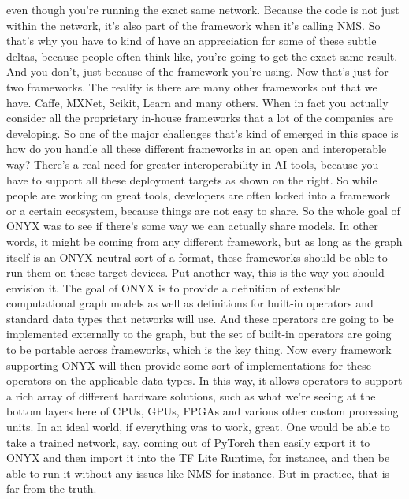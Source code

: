 {{{{{    even though you're running the exact same network.
    Because the code is not just within the network,
    it's also part of the framework when it's calling NMS.
    So that's why you have to kind of have an appreciation for some
    of these subtle deltas, because people often
    think like, you're going to get the exact same result.
    And you don't, just because of the framework you're using.
    Now that's just for two frameworks.
    The reality is there are many other frameworks out that we have.
    Caffe, MXNet, Scikit, Learn and many others.
    When in fact you actually consider all the proprietary in-house
    frameworks that a lot of the companies are developing.
    So one of the major challenges that's kind of emerged in this space
    is how do you handle all these different frameworks
    in an open and interoperable way?
    There's a real need for greater interoperability in AI tools,
    because you have to support all these deployment
    targets as shown on the right.
    So while people are working on great tools,
    developers are often locked into a framework or a certain ecosystem,
    because things are not easy to share.
    So the whole goal of ONYX was to see if there's
    some way we can actually share models.
    In other words, it might be coming from any different framework,
    but as long as the graph itself is an ONYX neutral sort of a format,
    these frameworks should be able to run them on these target devices.
    Put another way, this is the way you should envision it.
    The goal of ONYX is to provide a definition
    of extensible computational graph models as well
    as definitions for built-in operators and standard data types
    that networks will use.
    And these operators are going to be implemented externally to the graph,
    but the set of built-in operators are going
    to be portable across frameworks, which is the key thing.
    Now every framework supporting ONYX will then
    provide some sort of implementations for these operators
    on the applicable data types.
    In this way, it allows operators to support
    a rich array of different hardware solutions,
    such as what we're seeing at the bottom layers here of CPUs, GPUs, FPGAs
    and various other custom processing units.
    In an ideal world, if everything was to work, great.
    One would be able to take a trained network, say, coming out of PyTorch
    then easily export it to ONYX and then import it into the TF Lite Runtime,
    for instance, and then be able to run it without any issues like NMS
    for instance.
    But in practice, that is far from the truth.
}}}}}
